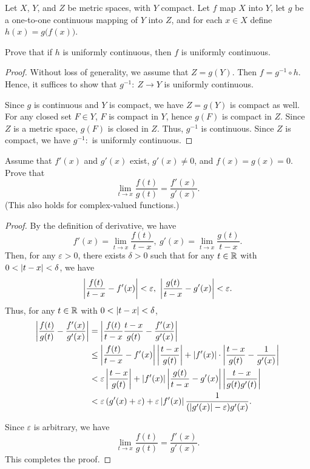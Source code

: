 \documentclass{article}
\begin{document}
\begin{problem}[4-26]
Let $X$, $Y$, and $Z$ be metric spaces, with $Y$ compact. Let $f$ map $X$ into $Y$, let $g$ be a one-to-one continuous mapping of $Y$ into $Z$, and for each $x\in X$ define $h(x)=g\bigl(f(x)\bigr)$.

Prove that if $h$ is uniformly continuous, then $f$ is uniformly continuous.
\end{problem}

\begin{proof}
  Without loss of generality, we assume that \( Z=g(Y) \). Then \( f=g^{-1}\circ h \). Hence, it suffices to show that \( g^{-1}:\ Z\to Y \) is uniformly continuous. \par
  Since \( g \) is continuous and \( Y \) is compact, we have \( Z=g(Y) \) is compact as well. For any closed set \( F\in Y \), \( F \) is compact in \( Y \), hence \( g(F) \) is compact in \( Z \). Since \( Z \) is a metric space, \( g(F) \) is closed in \( Z \). Thus, \( g^{-1} \) is continuous. Since \( Z \) is compact, we have \( g^{-1}: \) is uniformly continuous.
\end{proof}



\begin{problem}[5-7]
Assume that $f'(x)$ and $g'(x)$ exist, $g'(x)\neq 0$, and $f(x)=g(x)=0$. Prove that
\[
\lim_{t\to x}\frac{f(t)}{g(t)}=\frac{f'(x)}{g'(x)}.
\]
(This also holds for complex-valued functions.)
\end{problem}

\begin{proof}
  By the definition of derivative, we have
  \[ f'(x)=\lim_{t\to x}\frac{f(t)}{t-x},\ g'(x)=\lim_{t\to x}\frac{g(t)}{t-x}. \]
  Then, for any \( \varepsilon>0 \), there exists \( \delta>0 \) such that for any \( t\in\mathbb{R} \) with \( 0<\left|t-x\right|<\delta \), we have
  \[ \abs{\frac{f(t)}{t-x}-f'(x)}<\varepsilon,\ \abs{\frac{g(t)}{t-x}-g'(x)}<\varepsilon. \]
  Thus, for any \( t\in\mathbb{R} \) with \( 0<\left|t-x\right|<\delta \), 
  \begin{align*}
    \left|\frac{f(t)}{g(t)}-\frac{f'(x)}{g'(x)}\right|&=\left|\frac{f(t)}{t-x}\frac{t-x}{g(t)}-\frac{f'(x)}{g'(x)}\right|\\
    &\le \left|\frac{f(t)}{t-x}-f'(x)\right|\left|\frac{t-x}{g(t)}\right|+\left|f'(x)\right|\cdot\left|\frac{t-x}{g(t)}-\frac{1}{g'(x)}\right|\\
    &<\varepsilon\left|\frac{t-x}{g(t)}\right|+\left|f'(x)\right|\left|\frac{g(t)}{t-x}-g'(x)\right|\left|\frac{t-x}{g(t)g'(t)}\right|\\
    &<\varepsilon \left( g'(x)+\varepsilon \right)+\varepsilon \left|f'(x)\right|\frac{1}{(\left|g'(x)\right|-\varepsilon)g'(x)}.
  \end{align*}\par
  Since \( \varepsilon \) is arbitrary, we have
  \[ \lim_{t\to x}\frac{f(t)}{g(t)}=\frac{f'(x)}{g'(x)}. \]
  This completes the proof.
\end{proof}
\end{document}
